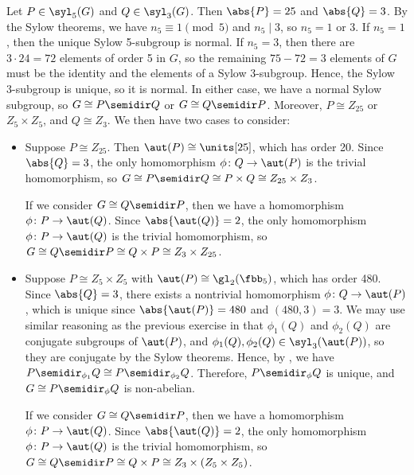 \begin{sol}
    Let $P \in \syl_5(G)$ and $Q \in \syl_3(G)$.
	Then $\abs{P} = 25$ and $\abs{Q} = 3$.
	By the Sylow theorems, we have $n_5 \equiv 1 \pmod 5$ and $n_5 \mid 3$, so $n_5 = 1$ or 3.
	If $n_5 = 1$, then the unique Sylow 5-subgroup is normal.
	If $n_5 = 3$, then there are $3 \cdot 24 = 72$ elements of order 5 in $G$, so the remaining $75 - 72 = 3$ elements of $G$ must be the identity and the elements of a Sylow 3-subgroup.
	Hence, the Sylow 3-subgroup is unique, so it is normal.
	In either case, we have a normal Sylow subgroup, so $G \cong P \semidir Q$ or $G \cong Q \semidir P$.
	Moreover, $P \cong Z_{25}$ or $Z_5 \times Z_5$, and $Q \cong Z_3$.
	We then have two cases to consider:
    \begin{itemize}
        \item Suppose $P \cong Z_{25}$.
        Then $\aut(P) \cong \units[25]$, which has order 20.
        Since $\abs{Q} = 3$, the only homomorphism $\phi \colon Q \to \aut(P)$ is the trivial homomorphism, so $G \cong P \semidir Q \cong P \times Q \cong Z_{25} \times Z_3$.
        
        If we consider $G \cong Q \semidir P$, then we have a homomorphism $\phi \colon P \to \aut(Q)$.
	    Since $\abs{\aut(Q)} = 2$, the only homomorphism $\phi \colon P \to \aut(Q)$ is the trivial homomorphism, so $G \cong Q \semidir P \cong Q \times P \cong Z_3 \times Z_{25}$.
        \item Suppose $P \cong Z_5 \times Z_5$ with $\aut(P) \cong \gl_2(\fbb_5)$, which has order 480.
        Since $\abs{Q} = 3$, there exists a nontrivial homomorphism $\phi \colon Q \to \aut(P)$, which is unique since $\abs{\aut(P)} = 480$ and $(480, 3) = 3$.
        We may use similar reasoning as the previous exercise in that $\phi_1(Q)$ and $\phi_2(Q)$ are conjugate subgroups of $\aut(P)$, and $\phi_1(Q), \phi_2(Q) \in \syl_3(\aut(P))$, so they are conjugate by the Sylow theorems.
        Hence, by , we have $P \semidir_{\phi_1} Q \cong P \semidir_{\phi_2} Q$.
        Therefore, $P \semidir_\phi Q$ is unique, and $G \cong P \semidir_\phi Q$ is non-abelian.
        
        If we consider $G \cong Q \semidir P$, then we have a homomorphism $\phi \colon P \to \aut(Q)$.
        Since $\abs{\aut(Q)} = 2$, the only homomorphism $\phi \colon P \to \aut(Q)$ is the trivial homomorphism, so $G \cong Q \semidir P \cong Q \times P \cong Z_3 \times (Z_5 \times Z_5)$.
    \end{itemize}
\end{sol}


